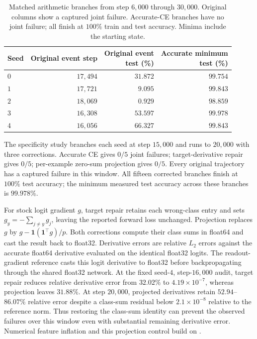 \begin{table}[htbp]
\centering
\small
\caption{Matched arithmetic branches from step $6{,}000$ through $30{,}000$. Original columns show a captured joint failure. Accurate-CE branches have no joint failure; all finish at $100\%$ train and test accuracy. Minima include the starting state.}
\label{tab:followup-arithmetic}
\begin{tabular}{lrrr}
\toprule
Seed & Original event step & \shortstack{Original event\\test (\%)} & \shortstack{Accurate minimum\\test (\%)} \\
\midrule
$0$ & $17{,}494$ & $31.872$ & $99.754$ \\
$1$ & $17{,}721$ & $9.095$ & $99.843$ \\
$2$ & $18{,}069$ & $0.929$ & $98.859$ \\
$3$ & $16{,}308$ & $53.597$ & $99.978$ \\
$4$ & $16{,}056$ & $66.327$ & $99.843$ \\
\bottomrule
\end{tabular}
\end{table}

The specificity study branches each seed at step $15{,}000$ and runs to $20{,}000$ with three corrections. Accurate CE gives $0/5$ joint failures; target-derivative repair gives $0/5$; per-example zero-sum projection gives $0/5$. Every original trajectory has a captured failure in this window. All fifteen corrected branches finish at $100\%$ test accuracy; the minimum measured test accuracy across these branches is $99.978\%$.

For stock logit gradient $g$, target repair retains each wrong-class entry and sets $g_y=-\sum_{j\ne y}g_j$, leaving the reported forward loss unchanged. Projection replaces $g$ by $g-\mathbf{1}(\mathbf{1}^{\top}g)/p$. Both corrections compute their class sums in float64 and cast the result back to float32. Derivative errors are relative $L_2$ errors against the accurate float64 derivative evaluated on the identical float32 logits. The readout-gradient reference casts this logit derivative to float32 before backpropagating through the shared float32 network. At the fixed seed-$4$, step-$16{,}000$ audit, target repair reduces relative derivative error from $32.02\%$ to $4.19\times10^{-7}$, whereas projection leaves $31.88\%$. At step $20{,}000$, projected derivatives retain $52.94$--$86.07\%$ relative error despite a class-sum residual below $2.1\times10^{-8}$ relative to the reference norm. Thus restoring the class-sum identity can prevent the observed failures over this window even with substantial remaining derivative error. Numerical feature inflation and this projection control build on \citet{liu2026glitching}.


